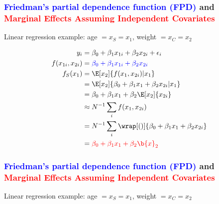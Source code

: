 \documentclass[11pt,dvipsnames,usenames,times]{beamer}
\newcommand*{\red}[1]{\textcolor{red}{#1}}%
\newcommand*{\blue}[1]{\textcolor{blue}{#1}}%
\begin{document}
\begin{frame}[fragile]\frametitle{\bf\textcolor{blue}{Friedman's partial dependence function (FPD)} and\\
\textcolor{red}{Marginal Effects Assuming Independent Covariates}}

Linear regression example: age $=x_S=x_1$, weight $=x_C=x_2$

\begin{align*}
y_i & = \beta_0 + \beta_1 x_{1i} + \beta_2 x_{2i} + \epsilon_i \\
f(x_{1i}, x_{2i}) & = \blue{\beta_0 + \beta_1 x_{1i} + \beta_2 x_{2i}} \\
f_S(x_1) & = \E[x_2]{f(x_{1}, x_{2i})|x_1} \\
& = \E[x_2]{\beta_0 + \beta_1 x_{1} + \beta_2 x_{2i}|x_1} \\
& = \beta_0 + \beta_1 x_{1} + \beta_2 \E[x_2]{x_{2i}} \\
& \approx N^{-1} \sum_i {f(x_{1}, x_{2i})} \\
& = N^{-1} \sum_i \wrap[()]{\beta_0 + \beta_1 x_{1} + \beta_2 x_{2i}} \\
& = \red{\beta_0 + \beta_1 x_{1} + \beta_2 \b{x}_{2}} 
\end{align*}
\end{frame}

\begin{frame}[fragile]\frametitle{\bf\textcolor{blue}{Friedman's partial dependence function (FPD)} and\\
\textcolor{red}{Marginal Effects Assuming Independent Covariates}}

Linear regression example: age $=x_S=x_1$, weight $=x_C=x_2$

\begin{center}
\end{center}
\end{frame}
\end{document}
